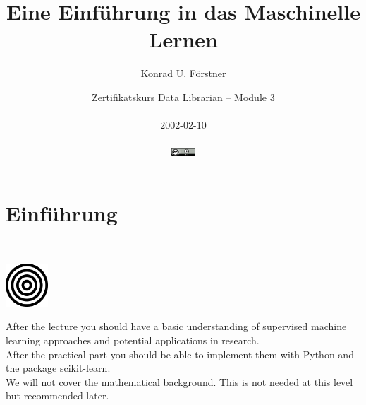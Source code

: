 \documentclass[aspectratio=169]{beamer}
\title{Eine Einführung in das Maschinelle Lernen}
\author{\small Konrad U. Förstner}
\institute{ZB MED -- Informationszentrum Lebenswissenschaften \& TH Köln}
\date{\scriptsize 
  Zertifikatskurs Data Librarian -- Module 3\\\ \\
  2002-02-10\\\ \\
  \href{https://creativecommons.org/licenses/by/4.0/}{\includegraphics[width=0.88cm]{images/creative_commons_attribute.png}}
}
\begin{document}

\begin{frame}{}
  \titlepage
\end{frame}

\logo{}


\setcounter{tocdepth}{1}
\begin{frame}{}
   \tableofcontents
\end{frame}

\section{Einführung}

\begin{frame}
  \begin{block}{}
    \vspace{0.5cm}
    \ \ \ \
    \begin{minipage}{0.10\textwidth}
      \begin{center}
        \includegraphics[width=1.6cm]{images/publicdomainvectors_target-plain.pdf}
      \end{center}        
    \end{minipage}
    \hfill
    \begin{minipage}{0.80\textwidth}
      After the lecture you should have a basic understanding of
      supervised machine learning approaches and potential
      applications in research.\\

      After the practical part you should be able to implement them
      with Python and the package scikit-learn.\\

      We will not cover the mathematical background. This is not
      needed at this level but recommended later.
    \end{minipage}
    \vspace{0.3cm}
  \end{block}
\end{frame}

\begin{frame}{}
   \tableofcontents[currentsection]
\end{frame}
\end{document}
